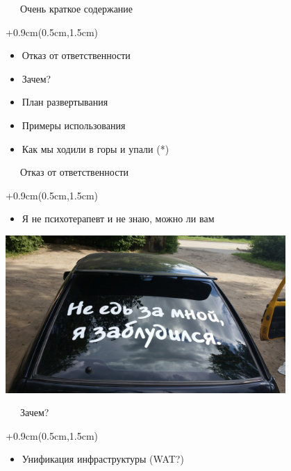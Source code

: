 \documentclass[xetex,18pt,aspectratio=43]{beamer}
\begin{document}
\begin{Large}


\begin{frame}{\ \ \ Очень краткое содержание}
\begin{textblock*}{\framewidth+0.9cm}(0.5cm,1.5cm)
\begin{itemize}
  \item Отказ от ответственности
  \item Зачем?
  \item План развертывания
  \item Примеры использования
  \item Как мы ходили в горы и упали (*)
\end{itemize}
\end{textblock*}
\end{frame}

\begin{frame}{\ \ \ Отказ от ответственности}
\begin{textblock*}{\framewidth+0.9cm}(0.5cm,1.5cm)
\begin{itemize}
  \item Я не психотерапевт и не знаю, можно ли вам
\end{itemize}
\begin{minipage}{\textwidth}
  \centering
  \includegraphics[height=6.0cm]{img/dont}
\end{minipage}
\end{textblock*}
\end{frame}

\begin{frame}{\ \ \ Зачем?}
\begin{textblock*}{\framewidth+0.9cm}(0.5cm,1.5cm)
\begin{itemize}
  \item Унификация инфраструктуры (WAT?)
\end{itemize}
\end{textblock*}
\end{frame}


\end{Large}
\end{document}
